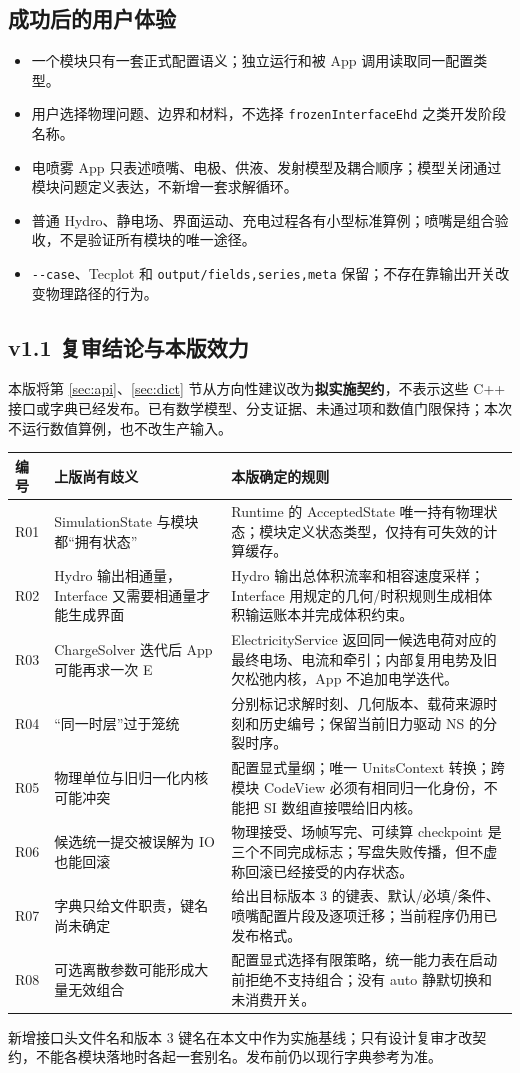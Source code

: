 \documentclass[UTF8,a4paper,11pt,fontset=fandol]{ctexart}
\numberwithin{equation}{section}
\newcommand{\code}[1]{\nolinkurl{#1}}
\begin{document}
\subsection{成功后的用户体验}
\begin{itemize}
\item 一个模块只有一套正式配置语义；独立运行和被 App 调用读取同一配置类型。
\item 用户选择物理问题、边界和材料，不选择 \code{frozenInterfaceEhd} 之类开发阶段名称。
\item 电喷雾 App 只表述喷嘴、电极、供液、发射模型及耦合顺序；模型关闭通过模块问题定义表达，不新增一套求解循环。
\item 普通 Hydro、静电场、界面运动、充电过程各有小型标准算例；喷嘴是组合验收，不是验证所有模块的唯一途径。
\item \code{--case}、Tecplot 和 \code{output/fields,series,meta} 保留；不存在靠输出开关改变物理路径的行为。
\end{itemize}

\subsection{v1.1 复审结论与本版效力}
本版将第 \ref{sec:api}、\ref{sec:dict} 节从方向性建议改为\textbf{拟实施契约}，不表示这些 C++ 接口或字典已经发布。已有数学模型、分支证据、未通过项和数值门限保持；本次不运行数值算例，也不改生产输入。
\begin{longtable}{@{}P{.07\textwidth}P{.32\textwidth}P{.55\textwidth}@{}}
\toprule 编号 & 上版尚有歧义 & 本版确定的规则\\\midrule\endhead
R01 & SimulationState 与模块都“拥有状态” & Runtime 的 AcceptedState 唯一持有物理状态；模块定义状态类型，仅持有可失效的计算缓存。\\
R02 & Hydro 输出相通量，Interface 又需要相通量才能生成界面 & Hydro 输出总体积流率和相容速度采样；Interface 用规定的几何/时积规则生成相体积输运账本并完成体积约束。\\
R03 & ChargeSolver 迭代后 App 可能再求一次 E & ElectricityService 返回同一候选电荷对应的最终电场、电流和牵引；内部复用电势及旧欠松弛内核，App 不追加电学迭代。\\
R04 & “同一时层”过于笼统 & 分别标记求解时刻、几何版本、载荷来源时刻和历史编号；保留当前旧力驱动 NS 的分裂时序。\\
R05 & 物理单位与旧归一化内核可能冲突 & 配置显式量纲；唯一 UnitsContext 转换；跨模块 CodeView 必须有相同归一化身份，不能把 SI 数组直接喂给旧内核。\\
R06 & 候选统一提交被误解为 IO 也能回滚 & 物理接受、场帧写完、可续算 checkpoint 是三个不同完成标志；写盘失败传播，但不虚称回滚已经接受的内存状态。\\
R07 & 字典只给文件职责，键名尚未确定 & 给出目标版本 3 的键表、默认/必填/条件、喷嘴配置片段及逐项迁移；当前程序仍用已发布格式。\\
R08 & 可选离散参数可能形成大量无效组合 & 配置显式选择有限策略，统一能力表在启动前拒绝不支持组合；没有 auto 静默切换和未消费开关。\\
\bottomrule
\end{longtable}
新增接口头文件名和版本 3 键名在本文中作为实施基线；只有设计复审才改契约，不能各模块落地时各起一套别名。发布前仍以现行字典参考为准。
\end{document}
